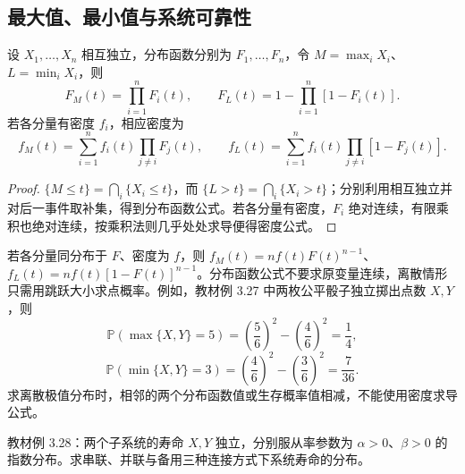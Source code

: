 \subsection{最大值、最小值与系统可靠性}

\begin{proposition}
\label{prop:study-ch3-extreme-distributions}
设 $X_1,\ldots,X_n$ 相互独立，分布函数分别为 $F_1,\ldots,F_n$，令 $M=\max_iX_i$、$L=\min_iX_i$，则
\begin{equation}
  F_M(t)=\prod_{i=1}^nF_i(t),\qquad
  F_L(t)=1-\prod_{i=1}^n[1-F_i(t)].
  \label{eq:study-ch3-extreme-cdf}
\end{equation}
若各分量有密度 $f_i$，相应密度为
\begin{equation}
  f_M(t)=\sum_{i=1}^nf_i(t)\prod_{j\ne i}F_j(t),\qquad
  f_L(t)=\sum_{i=1}^nf_i(t)\prod_{j\ne i}[1-F_j(t)].
  \label{eq:study-ch3-extreme-density}
\end{equation}
\end{proposition}

\begin{proof}
$\{M\le t\}=\bigcap_i\{X_i\le t\}$，而 $\{L>t\}=\bigcap_i\{X_i>t\}$；分别利用相互独立并对后一事件取补集，得到分布函数公式。若各分量有密度，$F_i$ 绝对连续，有限乘积也绝对连续，按乘积法则几乎处处求导便得密度公式。
\end{proof}

若各分量同分布于 $F$、密度为 $f$，则 $f_M(t)=nf(t)F(t)^{n-1}$、$f_L(t)=nf(t)[1-F(t)]^{n-1}$。分布函数公式不要求原变量连续，离散情形只需用跳跃大小求点概率。例如，教材例 3.27 中两枚公平骰子独立掷出点数 $X,Y$，则
\[
  \mathbb P(\max\{X,Y\}=5)=\left(\frac56\right)^2-\left(\frac46\right)^2=\frac14,
\]
\[
  \mathbb P(\min\{X,Y\}=3)=\left(\frac46\right)^2-\left(\frac36\right)^2=\frac7{36}.
\]
求离散极值分布时，相邻的两个分布函数值或生存概率值相减，不能使用密度求导公式。

\begin{example}
\label{ex:study-ch3-system-reliability}
教材例 3.28：两个子系统的寿命 $X,Y$ 独立，分别服从率参数为 $\alpha>0$、$\beta>0$ 的指数分布。求串联、并联与备用三种连接方式下系统寿命的分布。
\end{example}


